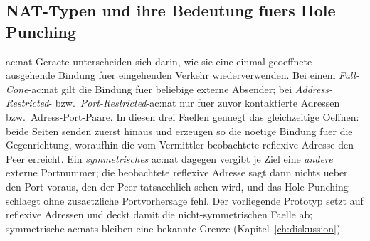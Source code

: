 \subsection{NAT-Typen und ihre Bedeutung fuers Hole Punching}
\label{sec:nat-typen}

\gls{ac:nat}-Geraete unterscheiden sich darin, wie sie eine einmal geoeffnete
ausgehende Bindung fuer eingehenden Verkehr wiederverwenden. Bei einem
\emph{Full-Cone}-\gls{ac:nat} gilt die Bindung fuer beliebige externe Absender;
bei \emph{Address-Restricted}- bzw.\ \emph{Port-Restricted}-\gls{ac:nat} nur fuer
zuvor kontaktierte Adressen bzw.\ Adress-Port-Paare. In diesen drei Faellen
genuegt das gleichzeitige Oeffnen: beide Seiten senden zuerst hinaus und erzeugen
so die noetige Bindung fuer die Gegenrichtung, woraufhin die vom Vermittler
beobachtete reflexive Adresse den Peer erreicht. Ein \emph{symmetrisches}
\gls{ac:nat} dagegen vergibt je Ziel eine \emph{andere} externe Portnummer; die
beobachtete reflexive Adresse sagt dann nichts ueber den Port voraus, den der
Peer tatsaechlich sehen wird, und das Hole Punching schlaegt ohne zusaetzliche
Portvorhersage fehl. Der vorliegende Prototyp setzt auf reflexive Adressen und
deckt damit die nicht-symmetrischen Faelle ab; symmetrische \gls{ac:nat}s bleiben
eine bekannte Grenze (Kapitel~\ref{ch:diskussion}).
